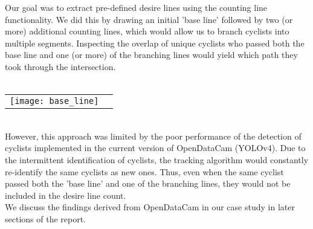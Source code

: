 Our goal was to extract pre-defined desire lines using the counting line functionality. We did this by drawing an initial 
'base line' followed by two (or more) additional counting lines, which would allow us to branch cyclists into multiple segments. Inspecting the
overlap of unique cyclists who passed both the base line and one (or more) of the branching lines would yield which path
they took through the intersection. 
\ \\

\ \\
\raggedbottom
\noindent
\begin{tabular}{@{}cc}
\texttt{[image: base\_line]} 
\end{tabular}
\ \\

However, this approach was limited by the poor performance of the detection of cyclists implemented in the current 
version of OpenDataCam (YOLOv4). Due to the intermittent identification of cyclists, the tracking algorithm would constantly 
re-identify the same cyclists as new ones. Thus, even when the same cyclist passed both the 'base line' and one of the 
branching lines, they would not be included in the desire line count.
\ \\

We discuss the findings derived from OpenDataCam in our case study in later sections of the report.